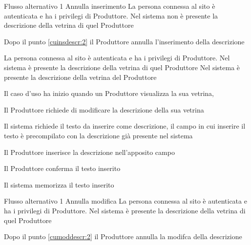 %
{Flusso alternativo 1}%
{Annulla inserimento}%
{La persona connessa al sito è autenticata e ha i privilegi di Produttore. Nel sistema non è presente la descrizione della vetrina di quel Produttore}%
{\postNulle}%
{\begin{enumCU}
		\item Dopo il punto \ref{cuinsdescr:2} il Produttore annulla l'inserimento della descrizione
	\end{enumCU}}%

\tabcuvspace

{}
{La persona connessa al sito è autenticata e ha i privilegi di Produttore. Nel sistema è presente la descrizione della vetrina di quel Produttore}
{Nel sistema è presente la descrizione della vetrina del Produttore}
{\begin{enumCU}
		\item Il caso d'uso ha inizio quando un Produttore visualizza la sua vetrina, 
		\item Il Produttore richiede di modificare la descrizione della sua vetrina
		\item Il sistema richiede il testo da inserire come descrizione, il campo in cui inserire il testo è precompilato con la descrizione già presente nel sistema 
		\item Il Produttore inserisce la descrizione nell'apposito campo\label{cumoddescr:2}
		\item Il Produttore conferma il testo inserito
		\item Il sistema memorizza il testo inserito
	\end{enumCU}}
%
{Flusso alternativo 1}%
{Annulla modifica}%
{La persona connessa al sito è autenticata e ha i privilegi di Produttore. Nel sistema è presente la descrizione della vetrina di quel Produttore}%
{\postNulle}%
{\begin{enumCU}
		\item Dopo il punto \ref{cumoddescr:2} il Produttore annulla la modifca della descrizione
	\end{enumCU}}%

\tabcuvspace

